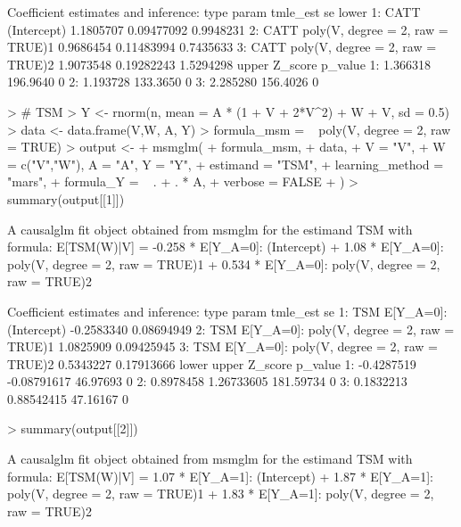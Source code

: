 \documentclass[article]{jss}
\begin{document}
\begin{Schunk}
\begin{Soutput}
Coefficient estimates and inference:
   type                            param  tmle_est         se     lower
1: CATT                      (Intercept) 1.1805707 0.09477092 0.9948231
2: CATT poly(V, degree = 2, raw = TRUE)1 0.9686454 0.11483994 0.7435633
3: CATT poly(V, degree = 2, raw = TRUE)2 1.9073548 0.19282243 1.5294298
      upper  Z_score p_value
1: 1.366318 196.9640       0
2: 1.193728 133.3650       0
3: 2.285280 156.4026       0
\end{Soutput}
\begin{Sinput}
> # TSM
> Y <- rnorm(n, mean = A * (1 + V + 2*V^2) + W + V, sd = 0.5)
> data <- data.frame(V,W, A, Y)
> formula_msm = ~ poly(V, degree = 2, raw = TRUE) 
> output <-
+   msmglm(
+     formula_msm,
+     data,
+     V = "V",
+     W = c("V","W"), A = "A", Y = "Y",
+     estimand = "TSM",
+     learning_method = "mars",
+     formula_Y = ~ . + . * A,
+     verbose = FALSE
+   )
> summary(output[[1]])
\end{Sinput}
\begin{Soutput}
A causalglm fit object obtained from msmglm for the estimand TSM with formula: 
E[TSM(W)|V] = -0.258 * E[Y_{A=0}]: (Intercept) + 1.08 * E[Y_{A=0}]: poly(V, degree = 2, raw = TRUE)1 + 0.534 * E[Y_{A=0}]: poly(V, degree = 2, raw = TRUE)2

Coefficient estimates and inference:
   type                                        param   tmle_est         se
1:  TSM                      E[Y_{A=0}]: (Intercept) -0.2583340 0.08694949
2:  TSM E[Y_{A=0}]: poly(V, degree = 2, raw = TRUE)1  1.0825909 0.09425945
3:  TSM E[Y_{A=0}]: poly(V, degree = 2, raw = TRUE)2  0.5343227 0.17913666
        lower       upper   Z_score p_value
1: -0.4287519 -0.08791617  46.97693       0
2:  0.8978458  1.26733605 181.59734       0
3:  0.1832213  0.88542415  47.16167       0
\end{Soutput}
\begin{Sinput}
> summary(output[[2]])
\end{Sinput}
\begin{Soutput}
A causalglm fit object obtained from msmglm for the estimand TSM with formula: 
E[TSM(W)|V] = 1.07 * E[Y_{A=1}]: (Intercept) + 1.87 * E[Y_{A=1}]: poly(V, degree = 2, raw = TRUE)1 + 1.83 * E[Y_{A=1}]: poly(V, degree = 2, raw = TRUE)2


\end{Soutput}
\end{Schunk}
\end{document}
